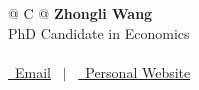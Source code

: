 \documentclass[a4paper,12pt]{article}
\begin{document}



\begin{tabularx}{\linewidth}{@{} C @{}}
\Huge{\textbf{Zhongli Wang}} \\[7.5pt]
PhD Candidate in Economics \\
\\
\href{mailto:nkwangzhongli@gmail.com}{\raisebox{-0.05\height}\faEnvelope \ Email} \ $|$ \ 
\href{https://sites.google.com/view/zhongli-wang/}{\raisebox{-0.05\height}\faGlobe \ Personal Website} %
\end{tabularx}



\end{document}
